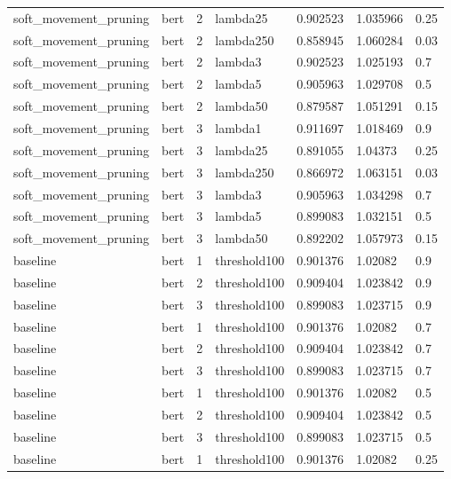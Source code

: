 \begin{tabular}{lllllll}
soft\_movement\_pruning &  bert &   2 &     lambda25 &  0.902523 &  1.035966 &   0.25 \\
soft\_movement\_pruning &  bert &   2 &    lambda250 &  0.858945 &  1.060284 &   0.03 \\
soft\_movement\_pruning &  bert &   2 &      lambda3 &  0.902523 &  1.025193 &    0.7 \\
soft\_movement\_pruning &  bert &   2 &      lambda5 &  0.905963 &  1.029708 &    0.5 \\
soft\_movement\_pruning &  bert &   2 &     lambda50 &  0.879587 &  1.051291 &   0.15 \\
soft\_movement\_pruning &  bert &   3 &      lambda1 &  0.911697 &  1.018469 &    0.9 \\
soft\_movement\_pruning &  bert &   3 &     lambda25 &  0.891055 &   1.04373 &   0.25 \\
soft\_movement\_pruning &  bert &   3 &    lambda250 &  0.866972 &  1.063151 &   0.03 \\
soft\_movement\_pruning &  bert &   3 &      lambda3 &  0.905963 &  1.034298 &    0.7 \\
soft\_movement\_pruning &  bert &   3 &      lambda5 &  0.899083 &  1.032151 &    0.5 \\
soft\_movement\_pruning &  bert &   3 &     lambda50 &  0.892202 &  1.057973 &   0.15 \\
             baseline &  bert &   1 & threshold100 &  0.901376 &   1.02082 &    0.9 \\
             baseline &  bert &   2 & threshold100 &  0.909404 &  1.023842 &    0.9 \\
             baseline &  bert &   3 & threshold100 &  0.899083 &  1.023715 &    0.9 \\
             baseline &  bert &   1 & threshold100 &  0.901376 &   1.02082 &    0.7 \\
             baseline &  bert &   2 & threshold100 &  0.909404 &  1.023842 &    0.7 \\
             baseline &  bert &   3 & threshold100 &  0.899083 &  1.023715 &    0.7 \\
             baseline &  bert &   1 & threshold100 &  0.901376 &   1.02082 &    0.5 \\
             baseline &  bert &   2 & threshold100 &  0.909404 &  1.023842 &    0.5 \\
             baseline &  bert &   3 & threshold100 &  0.899083 &  1.023715 &    0.5 \\
             baseline &  bert &   1 & threshold100 &  0.901376 &   1.02082 &   0.25 \\

\end{tabular}
